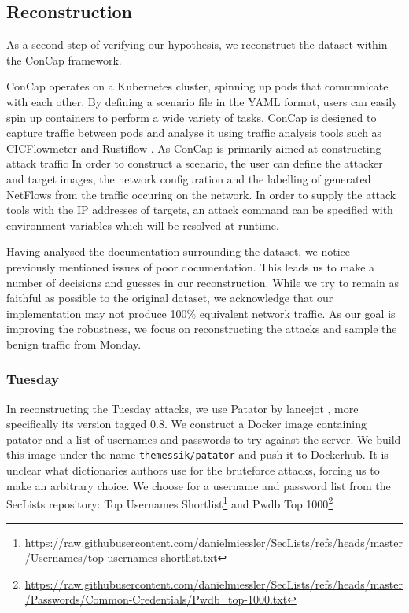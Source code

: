 \newpage
\subsection{Reconstruction} \label{reconstruction}

As a second step of verifying our hypothesis, we reconstruct the dataset within the ConCap framework. 

ConCap operates on a Kubernetes cluster, spinning up pods that communicate with each other. 
By defining a scenario file in the YAML format, users can easily spin up containers to perform a wide variety of tasks. 
ConCap is designed to capture traffic between pods and analyse it using traffic analysis tools such as CICFlowmeter \cite{cicflowmeter} and Rustiflow \cite{rustiflow}. As ConCap is primarily aimed at constructing attack traffic
In order to construct a scenario, the user can define the attacker and target images, the network configuration and the labelling of generated NetFlows from the traffic occuring on the network. In order to supply the attack tools with the IP addresses of targets, an attack command can be specified with environment variables which will be resolved at runtime.

Having analysed the documentation surrounding the dataset, we notice previously mentioned issues of poor documentation. This leads us to make a number of decisions and guesses in our reconstruction. While we try to remain as faithful as possible to the original dataset, we acknowledge that our implementation may not produce 100\% equivalent network traffic. As our goal is improving the robustness, we focus on reconstructing the attacks and sample the benign traffic from Monday. 

\subsubsection{Tuesday}
In reconstructing the Tuesday attacks, we use Patator by lancejot \cite{patator}, more specifically its version tagged 0.8. We construct a Docker image containing patator and a list of usernames and passwords to try against the server. We build this image under the name \texttt{themessik/patator} and push it to Dockerhub. It is unclear what dictionaries authors use for the bruteforce attacks, forcing us to make an arbitrary choice. We choose for a username and password list from the SecLists \cite{seclists} repository: Top Usernames Shortlist\footnote{\url{https://raw.githubusercontent.com/danielmiessler/SecLists/refs/heads/master/Usernames/top-usernames-shortlist.txt}} and Pwdb Top 1000\footnote{\url{https://raw.githubusercontent.com/danielmiessler/SecLists/refs/heads/master/Passwords/Common-Credentials/Pwdb_top-1000.txt}}

